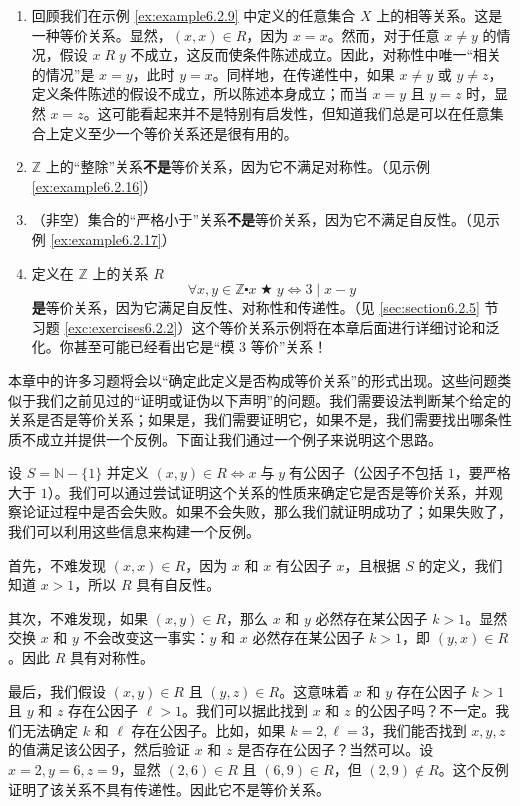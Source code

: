 \begin{example}
    \begin{enumerate}[label=(\arabic*)]
        \item 回顾我们在示例 \ref{ex:example6.2.9} 中定义的任意集合 $X$ 上的相等关系。这是一种等价关系。显然，$(x, x) \in R$，因为 $x=x$。然而，对于任意 $x \ne y$ 的情况，假设 $x \;R\; y$ 不成立，这反而使条件陈述成立。因此，对称性中唯一``相关的情况''是 $x=y$，此时 $y=x$。同样地，在传递性中，如果 $x \ne y$ 或 $y \ne z$，定义条件陈述的假设不成立，所以陈述本身成立；而当 $x = y$ 且 $y = z$ 时，显然 $x = z$。这可能看起来并不是特别有启发性，但知道我们总是可以在任意集合上定义至少一个等价关系还是很有用的。
        \item $\mathbb{Z}$ 上的``整除''关系\textbf{不是}等价关系，因为它不满足对称性。（见示例 \ref{ex:example6.2.16}）
        \item （非空）集合的``严格小于''关系\textbf{不是}等价关系，因为它不满足自反性。（见示例 \ref{ex:example6.2.17}）
        \item 定义在 $\mathbb{Z}$ 上的关系 $R$
        \[\forall x, y \in \mathbb{Z} \centerdot x \;\bigstar\; y \iff 3 \mid x - y\]
        \textbf{是}等价关系，因为它满足自反性、对称性和传递性。（见 \ref{sec:section6.2.5} 节习题 \ref{exc:exercises6.2.2}）这个等价关系示例将在本章后面进行详细讨论和泛化。你甚至可能已经看出它是``模 $3$ 等价''关系！
    \end{enumerate}
\end{example}

本章中的许多习题将会以``确定此定义是否构成等价关系''的形式出现。这些问题类似于我们之前见过的``证明或证伪以下声明''的问题。我们需要设法判断某个给定的关系是否是等价关系；如果是，我们需要证明它，如果不是，我们需要找出哪条性质不成立并提供一个反例。下面让我们通过一个例子来说明这个思路。\\

\begin{example}
    设 $S=\mathbb{N}-\{1\}$ 并定义 $(x, y) \in R \iff x \;\text{与}\; y \;\text{有公因子}$（公因子不包括 $1$，要严格大于 $1$）。我们可以通过尝试证明这个关系的性质来确定它是否是等价关系，并观察论证过程中是否会失败。如果不会失败，那么我们就证明成功了；如果失败了，我们可以利用这些信息来构建一个反例。

    首先，不难发现 $(x, x) \in R$，因为 $x$ 和 $x$ 有公因子 $x$，且根据 $S$ 的定义，我们知道 $x>1$，所以 $R$ 具有自反性。

    其次，不难发现，如果 $(x, y) \in R$，那么 $x$ 和 $y$ 必然存在某公因子 $k>1$。显然交换 $x$ 和 $y$ 不会改变这一事实：$y$ 和 $x$ 必然存在某公因子 $k>1$，即 $(y,x) \in R$。因此 $R$ 具有对称性。

    最后，我们假设 $(x, y) \in R$ 且 $ (y,z) \in R$。这意味着 $x$ 和 $y$ 存在公因子 $k>1$ 且 $y$ 和 $z$ 存在公因子 $\ell>1$。我们可以据此找到 $x$ 和 $z$ 的公因子吗？不一定。我们无法确定 $k$ 和 $\ell$ 存在公因子。比如，如果 $k=2, \ell=3$，我们能否找到 $x, y, z$ 的值满足该公因子，然后验证 $x$ 和 $z$ 是否存在公因子？当然可以。设 $x=2, y=6, z=9$，显然 $(2,6) \in R$ 且 $(6,9) \in R$，但 $(2,9) \notin R$。这个反例证明了该关系不具有传递性。因此它不是等价关系。
\end{example}

